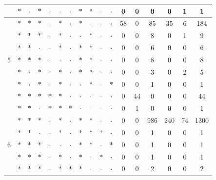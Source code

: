 \documentclass[11pt,a5paper,twoside]{book}
\begin{document}
{\begin{table}[ht!]
{\begin{tabular}{rcccccccccccccccc}
  &  $\ast$& $\cdot$& $\ast$& $\cdot$& $\cdot$& $\cdot$& $\ast$& $\ast$&  $\cdot$&  $\cdot$ & 0 & 0 & 0 & 0 & 1 & 1 \\ \hline
   &  $\ast$& $\ast$& $\ast$& $\cdot$& $\ast$& $\cdot$& $\ast$& $\cdot$&  $\cdot$&  $\cdot$ & 58 & 0 & 85 & 35 & 6 & 184 \\
   &  $\ast$& $\ast$& $\ast$& $\cdot$& $\ast$& $\cdot$& $\cdot$& $\ast$&  $\cdot$&  $\cdot$ & 0 & 0 & 8 & 0 & 1 & 9 \\
   &  $\ast$& $\ast$& $\cdot$& $\cdot$& $\ast$& $\cdot$& $\ast$& $\ast$&  $\cdot$&  $\cdot$ & 0 & 0 & 6 & 0 & 0 & 6 \\
  5 &  $\ast$& $\ast$& $\ast$& $\cdot$& $\cdot$& $\cdot$& $\ast$& $\ast$&  $\cdot$&  $\cdot$ & 0 & 0 & 8 & 0 & 0 & 8 \\
   & $\ast$& $\cdot$& $\ast$& $\cdot$& $\ast$& $\cdot$& $\ast$& $\ast$&  $\cdot$&  $\cdot$ & 0 & 0 & 3 & 0 & 2 & 5 \\
   & $\ast$& $\cdot$& $\ast$& $\cdot$& $\ast$& $\cdot$& $\cdot$& $\ast$&  $\cdot$&  $\ast$ & 0 & 0 & 1 & 0 & 0 & 1 \\
   & $\ast$& $\ast$& $\ast$& $\ast$& $\ast$& $\cdot$& $\cdot$& $\cdot$&  $\cdot$&  $\cdot$ & 0 & 44 & 0 & 0 & 0 & 44 \\
   & $\ast$& $\ast$& $\cdot$& $\ast$& $\ast$& $\ast$& $\cdot$& $\cdot$&  $\cdot$&  $\cdot$ & 0 & 1 & 0 & 0 & 0 & 1 \\ \hline
   & $\ast$& $\ast$& $\ast$& $\cdot$& $\ast$& $\cdot$& $\ast$& $\ast$&  $\cdot$&  $\cdot$ & 0 & 0 & 986 & 240 & 74 & 1300 \\
   & $\ast$& $\ast$& $\cdot$& $\cdot$& $\ast$& $\cdot$& $\ast$& $\ast$&  $\ast$&  $\cdot$ & 0 & 0 & 1 & 0 & 0 & 1 \\
  6 & $\ast$& $\ast$& $\ast$& $\cdot$& $\cdot$& $\cdot$& $\ast$& $\ast$&  $\cdot$&  $\ast$ & 0 & 0 & 1 & 0 & 0 & 1 \\
   & $\ast$& $\ast$& $\ast$& $\cdot$& $\ast$& $\cdot$& $\ast$& $\cdot$&  $\ast$&  $\cdot$ & 0 & 0 & 1 & 0 & 0 & 1 \\
  & $\ast$& $\ast$& $\ast$& $\cdot$& $\ast$& $\ast$& $\ast$& $\cdot$&  $\cdot$&  $\cdot$ & 0 & 0 & 2 & 0 & 0 & 2 \\
   \hline\hline
\end{tabular}}
\end{table}

}
\end{document}
